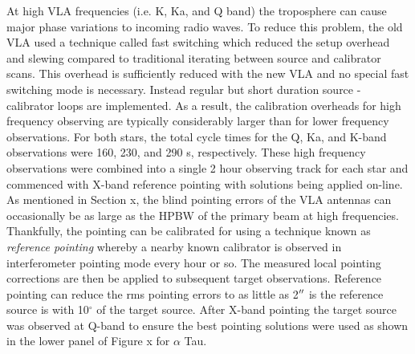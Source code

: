 At high VLA frequencies (i.e. K, Ka, and Q band) the troposphere can cause major phase variations to incoming radio waves. To reduce this problem, the old VLA used a technique called fast switching which reduced the setup overhead and slewing compared to traditional iterating between source and calibrator scans. This overhead is sufficiently reduced with the new VLA and no special fast switching mode is necessary. Instead regular but short duration source - calibrator loops are implemented. As a result, the calibration overheads for high frequency observing are typically considerably larger than for lower frequency observations. For both stars, the total cycle times for the Q, Ka, and K-band observations were 160, 230, and 290 s, respectively. These high frequency observations were combined into a single 2 hour observing track for each star and commenced with X-band reference pointing with solutions being applied on-line. As mentioned in Section x, the blind pointing errors of the VLA antennas can occasionally be as large as the HPBW of the primary beam at high frequencies. Thankfully, the pointing can be calibrated for using a technique known as \textit{reference pointing} whereby a nearby known calibrator is observed in interferometer pointing mode every hour or so. The measured local pointing corrections are then be applied to subsequent target observations. Reference pointing can reduce the rms pointing errors to as little as 2$^{\prime\prime}$ is the reference source is with 10$^\circ$ of the target source. After X-band pointing the target source was observed at Q-band to ensure the best pointing solutions were used as shown in the lower panel of Figure x for $\alpha$ Tau.  